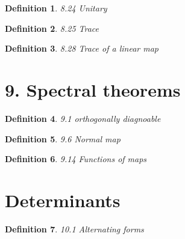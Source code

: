 \documentclass[12pt]{article}
\theoremstyle{plain}
\newtheorem{definition}{Definition}
\begin{document}
 
 \begin{definition} 
  8.24 Unitary 
 \end{definition}

 
 \begin{definition} 
  8.25 Trace 
 \end{definition}


 
 \begin{definition} 
  8.28 Trace of a linear map 
 \end{definition}

 \section{9. Spectral theorems}


 
 \begin{definition} 
  9.1 orthogonally diagnoable  
 \end{definition}


 
 \begin{definition} 
  9.6 Normal map 
 \end{definition}

 
 \begin{definition} 
  9.14 Functions of maps 
 \end{definition}

 \section{Determinants}
 
 \begin{definition} 
  10.1 Alternating forms
 \end{definition}
\end{document}

